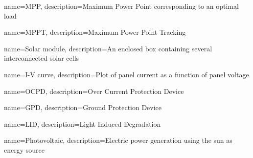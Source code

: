 {
  name=MPP,
  description={Maximum Power Point corresponding to an optimal load}
}

{
  name=MPPT,
  description={Maximum Power Point Tracking}
}

{
  name=Solar module,
  description={An enclosed box containing several interconnected solar cells}
}

{
  name=I-V curve,
  description={Plot of panel current as a function of panel voltage}
}

{
  name=OCPD,
  description={Over Current Protection Device}
}

{
  name=GPD,
  description={Ground Protection Device}
}

{
  name=LID,
  description={Light Induced Degradation}
}

{
  name=Photovoltaic,
  description={Electric power generation using the sun as energy source}
}

\makeglossaries
\glsaddall
